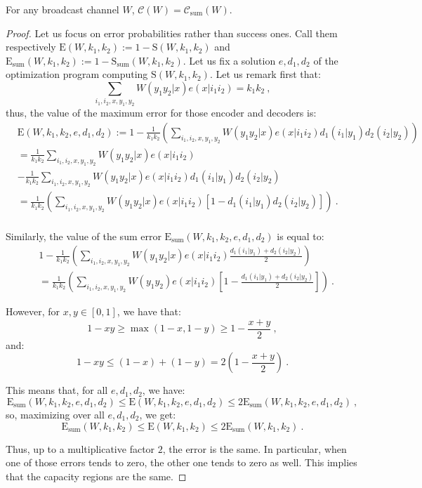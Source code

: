 \begin{proposition}
  \label{prop:capacitysum}
  For any broadcast channel $W$, $\mathcal{C}(W) = \mathcal{C}_{\text{sum}}(W)$.
\end{proposition}
\begin{proof}
  Let us focus on error probabilities rather than success ones. Call them respectively $\mathrm{E}(W,k_1,k_2) := 1-\mathrm{S}(W,k_1,k_2)$ and $\mathrm{E}_{\text{sum}}(W,k_1,k_2) := 1-\mathrm{S}_{\text{sum}}(W,k_1,k_2)$. Let us fix a solution $e,d_1,d_2$ of the optimization program computing $\mathrm{S}(W,k_1,k_2)$. Let us remark first that:
  \[ \sum_{i_1,i_2,x,y_1,y_2} W(y_1y_2|x)e(x|i_1i_2) = k_1k_2\ , \]
  thus, the value of the maximum error for those encoder and decoders is:
\begin{equation}
  \begin{aligned}
    &\mathrm{E}(W,k_1,k_2,e,d_1,d_2) := 1 -  \frac{1}{k_1k_2}\left(\sum_{i_1,i_2,x,y_1,y_2} W(y_1y_2|x)e(x|i_1i_2)d_1(i_1|y_1)d_2(i_2|y_2)\right)\\
    &=\frac{1}{k_1k_2}\sum_{i_1,i_2,x,y_1,y_2} W(y_1y_2|x)e(x|i_1i_2)\\
    &-\frac{1}{k_1k_2}\sum_{i_1,i_2,x,y_1,y_2} W(y_1y_2|x)e(x|i_1i_2)d_1(i_1|y_1)d_2(i_2|y_2)\\
    &=\frac{1}{k_1k_2}\left(\sum_{i_1,i_2,x,y_1,y_2} W(y_1y_2|x)e(x|i_1i_2)\left[1-d_1(i_1|y_1)d_2(i_2|y_2)\right]\right) \ .\\
  \end{aligned}
\end{equation}

Similarly, the value of the sum error $\mathrm{E}_{\text{sum}}(W,k_1,k_2,e,d_1,d_2)$ is equal to:
\begin{equation}
  \begin{aligned}
    &1 -  \frac{1}{k_1k_2}\left(\sum_{i_1,i_2,x,y_1,y_2} W(y_1y_2|x)e(x|i_1i_2)\frac{d_1(i_1|y_1)+d_2(i_2|y_2)}{2}\right)\\
    &= \frac{1}{k_1k_2}\left(\sum_{i_1,i_2,x,y_1,y_2} W(y_1y_2)e(x|i_1i_2)\left[1-\frac{d_1(i_1|y_1)+d_2(i_2|y_2)}{2}\right]\right) \ .
  \end{aligned}
\end{equation}

However, for $x,y \in [0,1]$, we have that:
\[1-xy \geq \max\left(1-x,1-y\right) \geq 1-\frac{x+y}{2} \ , \]
and:
\[1-xy \leq (1-x) + (1-y) = 2  \left(1-\frac{x+y}{2}\right) \ . \]

This means that, for all $e,d_1,d_2$, we have:
\[ \mathrm{E}_{\text{sum}}(W,k_1,k_2,e,d_1,d_2) \leq \mathrm{E}(W,k_1,k_2,e,d_1,d_2) \leq 2\mathrm{E}_{\text{sum}}(W,k_1,k_2,e,d_1,d_2) \ ,\]
so, maximizing over all $e,d_1,d_2$, we get:
\[ \mathrm{E}_{\text{sum}}(W,k_1,k_2) \leq \mathrm{E}(W,k_1,k_2) \leq 2\mathrm{E}_{\text{sum}}(W,k_1,k_2) \ .\]

Thus, up to a multiplicative factor $2$, the error is the same. In particular, when one of those errors tends to zero, the other one tends to zero as well. This implies that the capacity regions are the same.
\end{proof}

